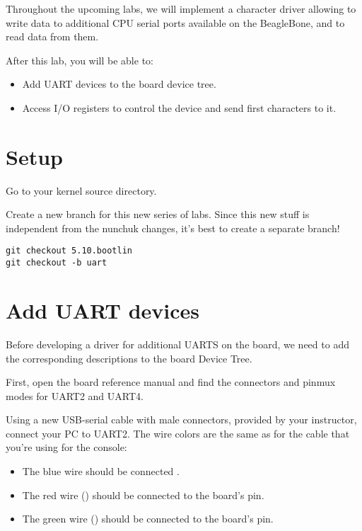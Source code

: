 
Throughout the upcoming labs, we will implement a character driver
allowing to write data to additional CPU serial ports available on
the BeagleBone, and to read data from them.

After this lab, you will be able to:

\begin{itemize}
\item Add UART devices to the board device tree.
\item Access I/O registers to control the device and
      send first characters to it.
\end{itemize}

\section{Setup}

Go to your kernel source directory.

Create a new branch for this new series of labs. Since this new stuff
is independent from the nunchuk changes, it's best to create a separate
branch!

\begin{verbatim}
git checkout 5.10.bootlin
git checkout -b uart
\end{verbatim}

\section{Add UART devices}

Before developing a driver for additional UARTS on the board, we
need to add the corresponding descriptions to the board Device Tree.

First, open the board reference manual and find the connectors
and pinmux modes for UART2 and UART4.

Using a new USB-serial cable with male connectors, provided by your
instructor, connect your PC to UART2. The wire colors are the same
as for the cable that you're using for the console:

\begin{itemize}
\item The blue wire should be connected .
\item The red wire () should be connected to the board's  pin.
\item The green wire () should be connected to the board's  pin.
\end{itemize}

